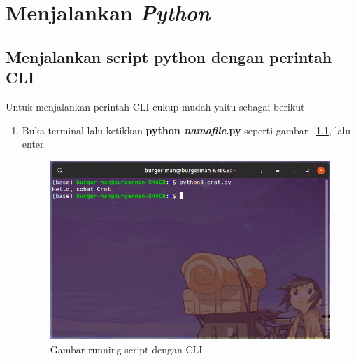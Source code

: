 \chapter{Menjalankan \textbf{\textit{Python}}}

\section{Menjalankan script python dengan perintah CLI}
Untuk menjalankan perintah CLI cukup mudah yaitu sebagai berikut

\begin{enumerate}

\item Buka terminal lalu ketikkan \textbf{python \textit{namafile}.py} seperti gambar ~\ref{cli}, lalu enter
\begin{figure}[H]
\centering
\includegraphics[width=1\textwidth]{figures/cli.png}
\caption{Gambar running script dengan CLI}
\label{cli}
\end{figure}

\end{enumerate}

